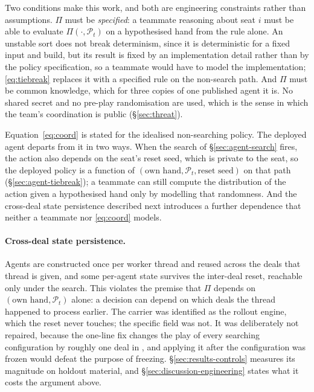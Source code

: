 Two conditions make this work, and both are engineering constraints rather than assumptions. $\Pi$
must be \emph{specified}: a teammate reasoning about seat $i$ must be able to evaluate
$\Pi(\cdot,\mathcal{P}_t)$ on a hypothesised hand from the rule alone. An unstable sort does not
break determinism, since it is deterministic for a fixed input and build, but its result is fixed by
an implementation detail rather than by the policy specification, so a teammate would have to model
the implementation; \eqref{eq:tiebreak} replaces it with a specified rule on the non-search path.
And $\Pi$ must be common knowledge, which for three copies of one published agent it is. No shared
secret and no pre-play randomisation are used, which is the sense in which the team's coordination
is public (\S\ref{sec:threat}).

Equation~\eqref{eq:coord} is stated for the idealised non-searching policy. The deployed agent
departs from it in two ways. When the search of \S\ref{sec:agent-search} fires, the action also
depends on the seat's reset seed, which is private to the seat, so the deployed policy is a function
of $(\text{own hand}, \mathcal{P}_t, \text{reset seed})$ on that path (\S\ref{sec:agent-tiebreak});
a teammate can still compute the distribution of the action given a hypothesised hand only by
modelling that randomness. And the cross-deal state persistence described next introduces a further
dependence that neither a teammate nor \eqref{eq:coord} models.

\paragraph{Cross-deal state persistence.} Agents are constructed once per worker thread and
reused across the deals that thread is given, and some per-agent state survives the inter-deal reset,
reachable only under the search. This violates the premise that $\Pi$ depends on
$(\text{own hand}, \mathcal{P}_t)$ alone: a decision can depend on which deals the thread happened to
process earlier. The carrier was identified as the rollout engine, which the reset never touches; the
specific field was not. It was deliberately not repaired, because the one-line fix changes the play of
every searching configuration by roughly one deal in \vsevenSsixIncidence{}, and applying it after the
configuration was frozen would defeat the purpose of freezing.
\S\ref{sec:results-controls} measures its magnitude on holdout material, and
\S\ref{sec:discussion-engineering} states what it costs the argument above.

